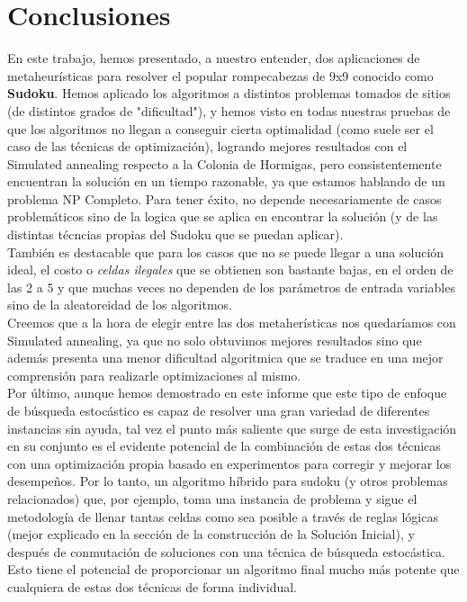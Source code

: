 \section{Conclusiones}

En este trabajo, hemos presentado, a nuestro entender, dos aplicaciones de metaheurísticas para resolver el popular rompecabezas de 9x9 conocido como \textbf{Sudoku}. Hemos aplicado los algoritmos a distintos problemas tomados de sitios (de distintos grados de "dificultad"), y hemos visto en todas nuestras pruebas de que los algoritmos no llegan a conseguir cierta optimalidad (como suele ser el caso de las técnicas de optimización), logrando mejores resultados con el Simulated annealing respecto a la Colonia de Hormigas, pero consistentemente encuentran la solución en un tiempo razonable, ya que estamos hablando de un problema NP Completo. Para tener éxito, no depende necesariamente de casos problemáticos sino de la logica que se aplica en encontrar la solución (y de las distintas técncias propias del Sudoku que se puedan aplicar).\\
También es destacable que para los casos que no se puede llegar a una solución ideal, el costo o \textit{celdas ilegales} que se obtienen son bastante bajas, en el orden de las 2 a 5 y que muchas veces no dependen de los parámetros de entrada variables sino de la aleatoreidad de los algoritmos. \\
Creemos que a la hora de elegir entre las dos metaherísticas nos quedaríamos con Simulated annealing, ya que no solo obtuvimos mejores resultados sino que además presenta una menor dificultad algoritmica que se traduce en una mejor comprensión para realizarle optimizaciones al mismo. \\
Por último, aunque hemos demostrado en este informe que este tipo de enfoque de búsqueda estocástico es capaz de resolver una gran variedad de diferentes instancias sin ayuda, tal vez el punto más saliente que surge de esta investigación en su conjunto es el evidente potencial de la combinación de estas dos técnicas con una optimización propia basado en experimentos para corregir y mejorar los desempeños.  Por lo tanto, un algoritmo híbrido para sudoku (y otros problemas relacionados) que, por ejemplo, toma una instancia de problema y sigue el metodología de  llenar tantas celdas como sea posible a través de reglas lógicas (mejor explicado en la sección de la construcción de la Solución Inicial), y después de conmutación de soluciones con una técnica de búsqueda estocástica. Esto tiene el potencial de proporcionar un algoritmo final mucho más potente que cualquiera de estas dos técnicas de forma individual. 

